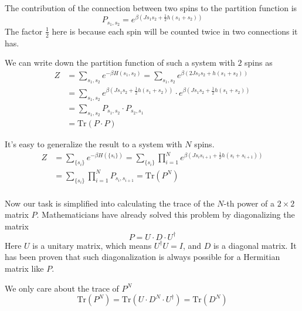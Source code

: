 \documentclass[11pt]{article}
\begin{document}
	The contribution of the connection between two spins to the partition function is
	\begin{equation} \label{eq:PartitionFunction1DGeneral2SpinsConnection}
		P_{s_1, s_2} = e^{\beta(J s_1 s_2 + \frac12h(s_1 + s_2))}
	\end{equation}
	The factor $\frac12$ here is because each spin will be counted twice in two connections it has.

	We can write down the partition function of such a system with $2$ spins as
	\begin{equation} \label{eq:PartitionFunction1DGeneral2SpinsConnectionSum}
		\begin{aligned}
		Z &= \sum_{s_1, s_2} e^{-\beta H(s_1, s_2)} = \sum_{s_1, s_2} e^{\beta(2J s_1 s_2 + h(s_1 + s_2))} \\
		&= \sum_{s_1, s_2} e^{\beta(J s_1 s_2 + \frac12h(s_1 + s_2))} \cdot e^{\beta(J s_1 s_2 + \frac12h(s_1 + s_2))} \\
		&= \sum_{s_1, s_2} P_{s_1, s_2} \cdot P_{s_2, s_1} \\
		&= \mathrm{Tr}(P \cdot P)
		\end{aligned}
	\end{equation}

	It's easy to generalize the result to a system with $N$ spins.
	\begin{equation} \label{eq:PartitionFunction1DGeneral}
		\begin{aligned}
			Z &= \sum_{\{s_i\}} e^{-\beta H(\{s_i\})} = \sum_{\{s_i\}} \prod_{i=1}^{N} e^{\beta(J s_i s_{i+1} + \frac12h(s_i + s_{i+1}))} \\
			&= \sum_{\{s_i\}} \prod_{i=1}^{N} P_{s_i, s_{i+1}} = \mathrm{Tr}(P^N) \\
		\end{aligned}
	\end{equation}

	Now our task is simplified into calculating the trace of the $N$-th power of a $2 \times 2$ matrix $P$. Mathematicians have already solved this problem by diagonalizing the matrix
	\begin{equation} \label{eq:MatrixPDiagonal}
		P = U \cdot D \cdot U^\dagger
	\end{equation}
	Here $U$ is a unitary matrix, which means $U^\dagger U = I$, and $D$ is a diagonal matrix. It has been proven that such diagonalization is always possible for a Hermitian matrix like $P$.

	We only care about the trace of $P^N$
	\begin{equation} \label{eq:MatrixPNTrace}
		\mathrm{Tr}(P^N) = \mathrm{Tr}(U \cdot D^N \cdot U^\dagger) = \mathrm{Tr}(D^N)
	\end{equation}
\end{document}
